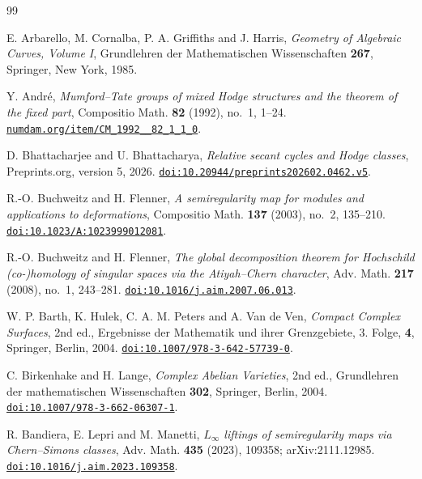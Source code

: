 \documentclass[11pt,reqno]{amsart}
\theoremstyle{plain}
\theoremstyle{definition}
\theoremstyle{remark}
\begin{document}
\begin{thebibliography}{99}

E. Arbarello, M. Cornalba, P. A. Griffiths and J. Harris,
\emph{Geometry of Algebraic Curves, Volume I},
Grundlehren der Mathematischen Wissenschaften \textbf{267},
Springer, New York, 1985.

Y. Andr\'e,
\emph{Mumford--Tate groups of mixed Hodge structures and the theorem of the
fixed part},
Compositio Math. \textbf{82} (1992), no.~1, 1--24.
\href{http://www.numdam.org/item/CM_1992__82_1_1_0/}{\texttt{numdam.org/item/CM\_1992\_\_82\_1\_1\_0}}.

D. Bhattacharjee and U. Bhattacharya,
\emph{Relative secant cycles and Hodge classes},
Preprints.org, version 5, 2026.
\href{https://doi.org/10.20944/preprints202602.0462.v5}{\texttt{doi:10.20944/preprints202602.0462.v5}}.

R.-O. Buchweitz and H. Flenner,
\emph{A semiregularity map for modules and applications to deformations},
Compositio Math. \textbf{137} (2003), no.~2, 135--210.
\href{https://doi.org/10.1023/A:1023999012081}{\texttt{doi:10.1023/A:1023999012081}}.

R.-O. Buchweitz and H. Flenner,
\emph{The global decomposition theorem for Hochschild (co-)homology of
singular spaces via the Atiyah--Chern character},
Adv. Math. \textbf{217} (2008), no.~1, 243--281.
\href{https://doi.org/10.1016/j.aim.2007.06.013}{\texttt{doi:10.1016/j.aim.2007.06.013}}.

W. P. Barth, K. Hulek, C. A. M. Peters and A. Van de Ven,
\emph{Compact Complex Surfaces}, 2nd ed.,
Ergebnisse der Mathematik und ihrer Grenzgebiete, 3. Folge, \textbf{4},
Springer, Berlin, 2004.
\href{https://doi.org/10.1007/978-3-642-57739-0}{\texttt{doi:10.1007/978-3-642-57739-0}}.

C. Birkenhake and H. Lange,
\emph{Complex Abelian Varieties}, 2nd ed.,
Grundlehren der mathematischen Wissenschaften \textbf{302},
Springer, Berlin, 2004.
\href{https://doi.org/10.1007/978-3-662-06307-1}{\texttt{doi:10.1007/978-3-662-06307-1}}.

R. Bandiera, E. Lepri and M. Manetti,
\emph{$L_{\infty}$ liftings of semiregularity maps via Chern--Simons classes},
Adv. Math. \textbf{435} (2023), 109358; arXiv:2111.12985.
\href{https://doi.org/10.1016/j.aim.2023.109358}{\texttt{doi:10.1016/j.aim.2023.109358}}.


\end{thebibliography}
\end{document}
